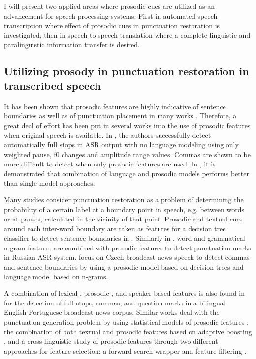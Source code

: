 I will present two applied areas where prosodic cues are utilized as an advancement for speech processing systems. First in automated speech transcription where effect of prosodic cues in punctuation restoration is investigated, then in speech-to-speech translation where a complete linguistic and paralinguistic information transfer is desired.

\subsection{Utilizing prosody in punctuation restoration in transcribed speech}
\label{sota:punk_prosody}
It has been shown that prosodic features are highly indicative of sentence boundaries as well as of punctuation placement in many works \citep{punctuation_book}. Therefore, a great deal of effort has been put in several works into the use of prosodic features when original speech is available. In \cite{levy2012effect}, the authors successfully detect automatically full stops in ASR output with no language modeling using only weighted pause, f0 changes and amplitude range values. Commas are shown to be more difficult to detect when only prosodic features are used. In \cite{baron2002automatic}, it is demonstrated that combination of language and prosodic models performs better than single-model approaches. 

Many studies consider punctuation restoration as a problem of determining the probability of a certain label at a boundary point in speech, e.g. between words or at pauses, calculated in the vicinity of that point. Prosodic and textual cues around each inter-word boundary are taken as features for a decision tree classifier to detect sentence boundaries in \cite{liu2006study}. Similarly in \cite{khomitsevich2015combining}, word and grammatical n-gram features are combined with prosodic features to detect punctuation marks in Russian ASR system. \cite{Psutka04automaticpunctuation} focus on Czech broadcast news speech to detect commas and sentence boundaries by using a prosodic model based on decision trees and language model based on n-grams. 

A combination of lexical-, prosodic-, and speaker-based features is also found in \cite{batista2012bilingual} for the detection of full stops, commas, and question marks in a bilingual English-Portuguese broadcast news corpus. Similar works deal with the punctuation generation problem by using statistical models of prosodic features \citep{Christensen01punctuationannotation}, the combination of both textual and prosodic features based on adaptive boosting \citep{kolar2012development}, and a cross-linguistic study of prosodic features through two different approaches for feature selection: a forward search wrapper and feature filtering \citep{fung2007cross}. 

